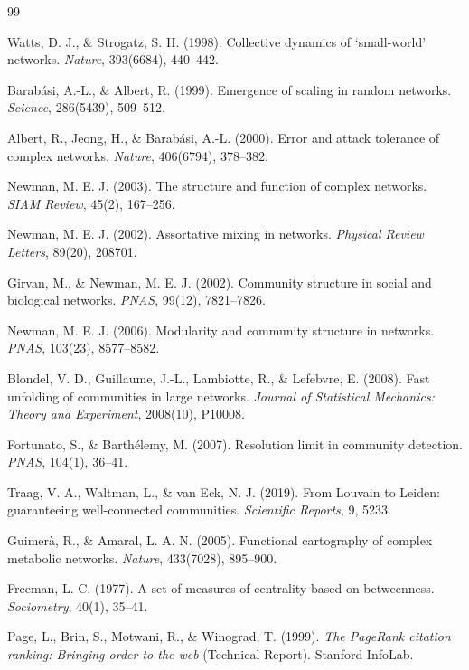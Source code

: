 \begin{thebibliography}{99}
\small

 Watts, D. J., \& Strogatz, S. H. (1998). Collective dynamics of `small-world' networks. \emph{Nature}, 393(6684), 440--442.

 Barabási, A.-L., \& Albert, R. (1999). Emergence of scaling in random networks. \emph{Science}, 286(5439), 509--512.

 Albert, R., Jeong, H., \& Barabási, A.-L. (2000). Error and attack tolerance of complex networks. \emph{Nature}, 406(6794), 378--382.

 Newman, M. E. J. (2003). The structure and function of complex networks. \emph{SIAM Review}, 45(2), 167--256.

 Newman, M. E. J. (2002). Assortative mixing in networks. \emph{Physical Review Letters}, 89(20), 208701.

 Girvan, M., \& Newman, M. E. J. (2002). Community structure in social and biological networks. \emph{PNAS}, 99(12), 7821--7826.

 Newman, M. E. J. (2006). Modularity and community structure in networks. \emph{PNAS}, 103(23), 8577--8582.

 Blondel, V. D., Guillaume, J.-L., Lambiotte, R., \& Lefebvre, E. (2008). Fast unfolding of communities in large networks. \emph{Journal of Statistical Mechanics: Theory and Experiment}, 2008(10), P10008.

 Fortunato, S., \& Barthélemy, M. (2007). Resolution limit in community detection. \emph{PNAS}, 104(1), 36--41.

 Traag, V. A., Waltman, L., \& van Eck, N. J. (2019). From Louvain to Leiden: guaranteeing well-connected communities. \emph{Scientific Reports}, 9, 5233.

 Guimerà, R., \& Amaral, L. A. N. (2005). Functional cartography of complex metabolic networks. \emph{Nature}, 433(7028), 895--900.

 Freeman, L. C. (1977). A set of measures of centrality based on betweenness. \emph{Sociometry}, 40(1), 35--41.

 Page, L., Brin, S., Motwani, R., \& Winograd, T. (1999). \emph{The PageRank citation ranking: Bringing order to the web} (Technical Report). Stanford InfoLab.


\end{thebibliography}
